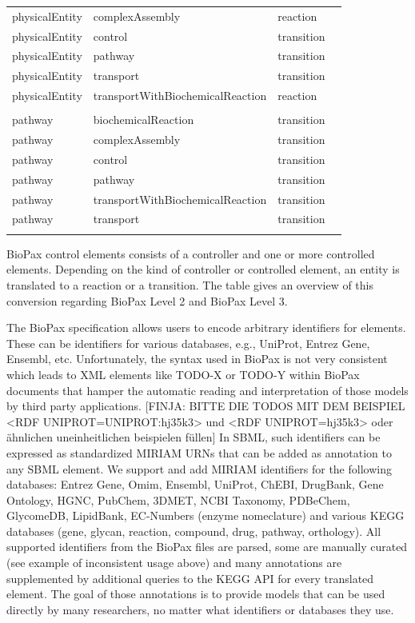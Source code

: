 \documentclass{bioinfo}
\begin{document}
\begin{methods}
\begin{table}[!t]
{\begin{tabular}{llll}
physicalEntity & complexAssembly                    & reaction\\
physicalEntity & control                            & transition\\
physicalEntity & pathway                            & transition\\
physicalEntity & transport                          & transition\\
physicalEntity & transportWithBiochemicalReaction   & reaction\\
\\
pathway         & biochemicalReaction               & transition\\
pathway         & complexAssembly                   & transition\\
pathway         & control                           & transition\\
pathway         & pathway                           & transition\\
pathway         & transportWithBiochemicalReaction  & transition\\
pathway         & transport                         & transition\\\botrule
\end{tabular}}{BioPax control elements consists of a controller and one or more controlled elements. 
Depending on the kind of controller or controlled element, an entity is translated to a reaction or a transition. 
The table gives an overview of this conversion regarding BioPax Level 2 and BioPax Level 3.}
\end{table}



The BioPax specification allows users to encode arbitrary identifiers for elements. 
These can be identifiers for various databases, e.g., UniProt, Entrez Gene, Ensembl, etc. Unfortunately, the syntax used in BioPax is not very consistent which leads to XML elements like TODO-X or TODO-Y within BioPax documents that hamper the automatic reading and interpretation of those models by third party applications. 
[FINJA: BITTE DIE TODOS MIT DEM BEISPIEL <RDF UNIPROT=UNIPROT:hj35k3> und <RDF UNIPROT=hj35k3> oder \"ahnlichen uneinheitlichen beispielen f\"ullen]
In SBML, such identifiers can be expressed as standardized MIRIAM URNs that can be added as annotation to any SBML element. 
We support and add MIRIAM identifiers for the following databases: Entrez Gene, Omim, Ensembl, UniProt, ChEBI, DrugBank, Gene Ontology, HGNC, PubChem, 3DMET, NCBI Taxonomy, PDBeChem, GlycomeDB, LipidBank, EC-Numbers (enzyme nomeclature) and various KEGG databases (gene, glycan, reaction, compound, drug, pathway, orthology).
All supported identifiers from the BioPax files are parsed, some are manually curated (see example of inconsistent usage above) and many annotations are supplemented by additional queries to the KEGG API for every translated element.
The goal of those annotations is to provide models that can be used directly by many researchers, no matter what identifiers or databases they use.


\end{methods}
\end{document}
